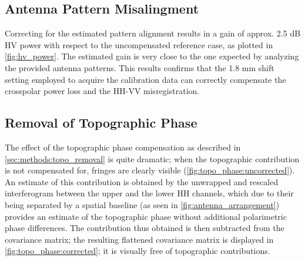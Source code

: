 \subsection{Antenna Pattern Misalingment}\label{sec:discussion:misalignment}
Correcting for the estimated pattern alignment results in a gain of approx. 2.5 dB HV power with respect to the uncompensated reference case, as plotted in \autoref{fig:hv_power}. The estimated gain is very close to the one expected by analyzing the provided antenna patterns. This results confirms that the 1.8 mm shift setting employed to acquire the calibration data can correctly compensate the crosspolar power loss and the HH-VV misregistration.
\subsection{Removal of Topographic Phase}
The effect of the topographic phase compensation as described in \autoref{sec:methods:topo_removal} is quite dramatic;
when the topographic contribution is not compensated for, fringes are clearly visible (\autoref{fig:topo_phase:uncorrected}). An estimate of this contribution is obtained by the unwrapped and rescaled interferogram between the upper and the lower HH channels, which due to their being separated by a spatial baseline (as seen in \autoref{fig:antenna_arrangement}) provides an estimate of the topographic phase without additional polarimetric phase differences. The contribution thus obtained is then subtracted from the covariance matrix; the resulting flattened covariance matrix is displayed in \autoref{fig:topo_phase:corrected}; it is visually free of topographic contributions.
